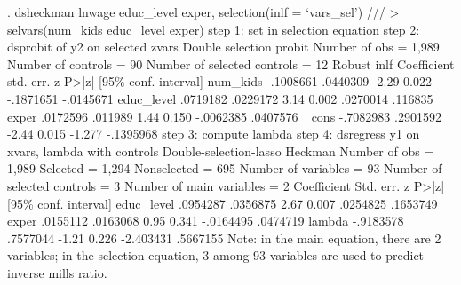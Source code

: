 . dsheckman lnwage educ_level exper, selection(inlf = `vars_sel') ///
>         selvars(num_kids educ_level exper)
{\smallskip}
step 1: set {} in selection equation
step 2: dsprobit of y2 on selected zvars
{\smallskip}
Double selection probit               Number of obs               =      1,989
                                      Number of controls          =         90
                                      Number of selected controls =         12
             {\VBAR}               Robust
        inlf {\VBAR} Coefficient  std. err.      z    P>|z|     [95\% conf. interval]
    num_kids {\VBAR}  -.1008661   .0440309    -2.29   0.022    -.1871651   -.0145671
  educ_level {\VBAR}   .0719182   .0229172     3.14   0.002     .0270014     .116835
       exper {\VBAR}   .0172596    .011989     1.44   0.150    -.0062385    .0407576
       _cons {\VBAR}  -.7082983   .2901592    -2.44   0.015       -1.277   -.1395968
step 3: compute lambda
step 4: dsregress y1 on xvars, lambda with controls
{\smallskip}
Double-selection-lasso Heckman        Number of obs               =      1,989
                                             Selected             =      1,294
                                             Nonselected          =        695
                                      Number of variables         =         93
                                      Number of selected controls =          3
                                      Number of main variables    =          2
{\smallskip}
             {\VBAR} Coefficient  Std. err.      z    P>|z|     [95\% conf. interval]
  educ_level {\VBAR}   .0954287   .0356875     2.67   0.007     .0254825    .1653749
       exper {\VBAR}   .0155112   .0163068     0.95   0.341    -.0164495    .0474719
      lambda {\VBAR}  -.9183578   .7577044    -1.21   0.226    -2.403431    .5667155
Note: in the main equation, there are 2 variables; in the selection equation,
      3 among 93 variables are used to predict inverse mills ratio.
